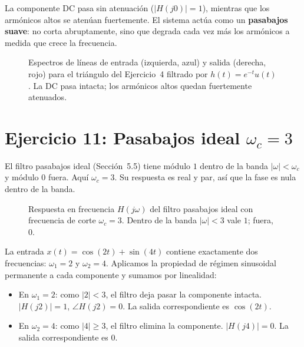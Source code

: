 \documentclass[10pt,a4paper]{article}
\begin{document}
\begin{enumerate}[label=\textbf{\alph*)}]
		La componente DC pasa sin atenuación ($|H(j0)| = 1$), mientras que los armónicos altos se atenúan fuertemente. El sistema actúa como un \textbf{pasabajos suave}: no corta abruptamente, sino que degrada cada vez más los armónicos a medida que crece la frecuencia.

		\begin{figure}[H]
			\centering
			
			\caption{Espectros de líneas de entrada (izquierda, azul) y salida (derecha, rojo) para el triángulo del Ejercicio~4 filtrado por $h(t) = e^{-t}u(t)$. La DC pasa intacta; los armónicos altos quedan fuertemente atenuados.}
			\label{fig:ej10_espectros}
		\end{figure}
	\end{enumerate}

	\section*{Ejercicio 11: Pasabajos ideal $\omega_c = 3$}

	El filtro pasabajos ideal (Sección~5.5) tiene módulo $1$ dentro de la banda $|\omega| < \omega_c$ y módulo $0$ fuera. Aquí $\omega_c = 3$. Su respuesta es real y par, así que la fase es nula dentro de la banda.

	\begin{figure}[H]
		\centering
		
		\caption{Respuesta en frecuencia $H(j\omega)$ del filtro pasabajos ideal con frecuencia de corte $\omega_c = 3$. Dentro de la banda $|\omega| < 3$ vale $1$; fuera, $0$.}
		\label{fig:ej11}
	\end{figure}

	La entrada $x(t) = \cos(2t) + \sin(4t)$ contiene exactamente dos frecuencias: $\omega_1 = 2$ y $\omega_2 = 4$. Aplicamos la propiedad de régimen sinusoidal permanente a cada componente y sumamos por linealidad:
	\begin{itemize}
		\item En $\omega_1 = 2$: como $|2| < 3$, el filtro deja pasar la componente intacta. $|H(j2)| = 1$, $\angle H(j2) = 0$. La salida correspondiente es $\cos(2t)$.
		\item En $\omega_2 = 4$: como $|4| \geq 3$, el filtro elimina la componente. $|H(j4)| = 0$. La salida correspondiente es $0$.
	\end{itemize}
\end{document}
